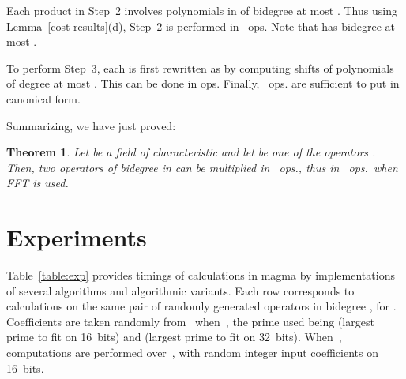 \documentclass{sig-alt-full}
\newtheorem{theorem}{Theorem}
\begin{document}
Each product in Step~2 involves polynomials in  of bidegree at most .
Thus using Lemma~\ref{cost-results}(d), Step~2 is performed in
~ops.
Note that  has bidegree at most .



To perform Step~3, each  is first rewritten as
 by computing 
shifts of polynomials of degree at most . This can be done in  ops.
{}Finally,  ~ops. are sufficient to put  in canonical form.

Summarizing, we have just proved:
\begin{theorem}
Let\/  be a field of characteristic  and let  be one of the operators .
Then, two operators of bidegree  in  can be multiplied in ~ops., thus in ~ops.\ when FFT is used.
\end{theorem}




\section{Experiments}\label{sec:Experiments}

Table~\ref{table:exp} provides timings of calculations in \textsf{magma} by implementations of several algorithms and algorithmic variants.
Each row corresponds to calculations on the same pair of randomly generated operators in bidegree , for .
Coefficients are taken randomly from~ when~, the prime used being
 (largest prime to fit on 16~bits) and  (largest prime to fit on 32~bits).
When~, computations are performed over~, with random integer input coefficients on 16~bits.
\end{document}
